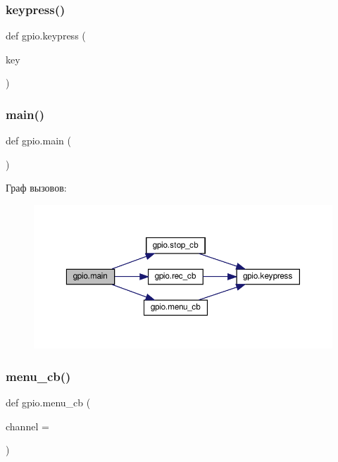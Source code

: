 \subsubsection{\texorpdfstring{keypress()}{keypress()}}
{\footnotesize\ttfamily def gpio.\+keypress (\begin{DoxyParamCaption}\item[{}]{key }\end{DoxyParamCaption})}

\mbox{\label{namespacegpio_ae76663bf79b1124596595094a9a95e5a}} 
\subsubsection{\texorpdfstring{main()}{main()}}
{\footnotesize\ttfamily def gpio.\+main (\begin{DoxyParamCaption}{ }\end{DoxyParamCaption})}

Граф вызовов\+:\nopagebreak
\begin{figure}[H]
\begin{center}
\leavevmode
\includegraphics[width=350pt]{namespacegpio_ae76663bf79b1124596595094a9a95e5a_cgraph}
\end{center}
\end{figure}
\mbox{\label{namespacegpio_a67087cfb10312de7d9b64c388777585f}} 
\subsubsection{\texorpdfstring{menu\+\_\+cb()}{menu\_cb()}}
{\footnotesize\ttfamily def gpio.\+menu\+\_\+cb (\begin{DoxyParamCaption}\item[{}]{channel = {} }\end{DoxyParamCaption})}

